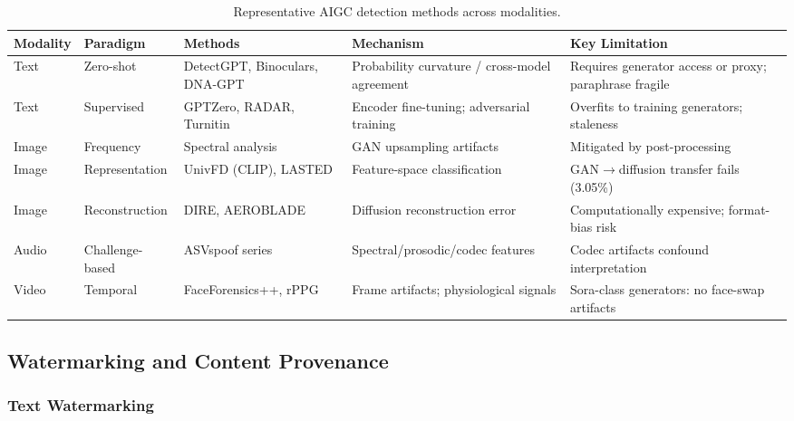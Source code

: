 \begin{table}[htbp]
\centering
\caption{Representative AIGC detection methods across modalities.}
\label{tab:detection}
\small
\begin{tabular}{p{1.3cm}p{2.0cm}p{2.8cm}p{2.5cm}p{3.5cm}}
\toprule
\textbf{Modality} & \textbf{Paradigm} & \textbf{Methods} & \textbf{Mechanism} & \textbf{Key Limitation} \\
\midrule
Text & Zero-shot & DetectGPT, Binoculars, DNA-GPT & Probability curvature / cross-model agreement & Requires generator access or proxy; paraphrase fragile \\
\addlinespace
Text & Supervised & GPTZero, RADAR, Turnitin & Encoder fine-tuning; adversarial training & Overfits to training generators; staleness \\
\addlinespace
Image & Frequency & Spectral analysis & GAN upsampling artifacts & Mitigated by post-processing \\
\addlinespace
Image & Representation & UnivFD (CLIP), LASTED & Feature-space classification & GAN$\to$diffusion transfer fails (3.05\%) \\
\addlinespace
Image & Reconstruction & DIRE, AEROBLADE & Diffusion reconstruction error & Computationally expensive; format-bias risk \\
\addlinespace
Audio & Challenge-based & ASVspoof series & Spectral/prosodic/codec features & Codec artifacts confound interpretation \\
\addlinespace
Video & Temporal & FaceForensics++, rPPG & Frame artifacts; physiological signals & Sora-class generators: no face-swap artifacts \\
\bottomrule
\end{tabular}
\end{table}


\subsection{Watermarking and Content Provenance}
\label{sec:watermark}

\subsubsection{Text Watermarking}
\label{sec:wm-text}

